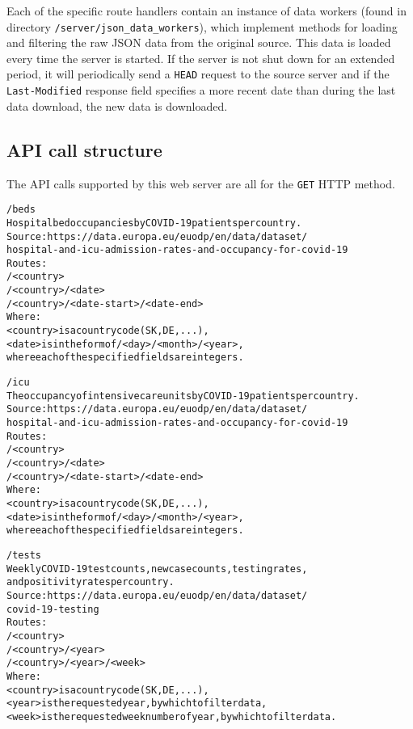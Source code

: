 \documentclass[pdftex, 11pt, a4paper]{article}
\newcommand{\code}{\texttt}
\begin{document}
    Each of the specific route handlers contain an instance of data workers
    (found in directory \newline \code{/server/json\_data\_workers}), which implement methods for
    loading and filtering the raw JSON data from the original source. This data is loaded
    every time the server is started. If the server is not shut down for an extended period,
    it will periodically send a \code{HEAD} request to the source server and if the
    \code{Last-Modified} response field specifies a more recent date than during
    the last data download, the new data is downloaded.

    \subsection{API call structure} \label{sec:api_structure}
    The API calls supported by this web server are all for the \code{GET} HTTP method.

    \begin{alltt}
    /beds
        Hospital bed occupancies by COVID-19 patients per country.
        Source: https://data.europa.eu/euodp/en/data/dataset/
                    hospital-and-icu-admission-rates-and-occupancy-for-covid-19
        Routes:
            /<country>
            /<country>/<date>
            /<country>/<date-start>/<date-end>
        Where:
            <country>   is a country code (SK, DE, ...),
            <date>      is in the form of /<day>/<month>/<year>,
                        where each of the specified fields are integers.

    /icu
        The occupancy of intensive care units by COVID-19 patients per country.
        Source: https://data.europa.eu/euodp/en/data/dataset/
                    hospital-and-icu-admission-rates-and-occupancy-for-covid-19
        Routes:
            /<country>
            /<country>/<date>
            /<country>/<date-start>/<date-end>
        Where:
            <country>   is a country code (SK, DE, ...),
            <date>      is in the form of /<day>/<month>/<year>,
                        where each of the specified fields are integers.

    /tests
        Weekly COVID-19 test counts, new case counts, testing rates,
        and positivity rates per country.
        Source: https://data.europa.eu/euodp/en/data/dataset/
                    covid-19-testing
        Routes:
            /<country>
            /<country>/<year>
            /<country>/<year>/<week>
        Where:
            <country>   is a country code (SK, DE, ...),
            <year>      is the requested year, by which to filter data,
            <week>      is the requested week number of year, by which to filter data.
    \end{alltt}
\end{document}
